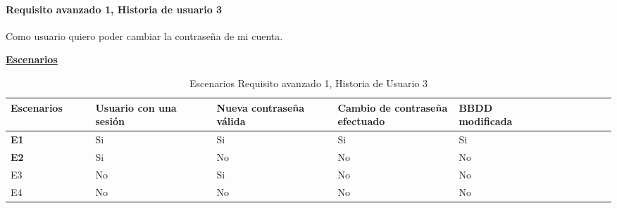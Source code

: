 \documentclass[../ei103948-project-documentation.tex]{subfiles}
\begin{document}
						\newpage


				\paragraph{Requisito avanzado 1, Historia de usuario 3}
				Como usuario quiero poder cambiar la contraseña de mi cuenta.

				\begin{center}
					\textbf{\underline{Escenarios}}
					\begin{table}[H]
						\centering
						\begin{tabular}{|p{0.14\linewidth}|p{0.20\linewidth}|p{0.20\linewidth}|p{0.20\linewidth}|p{0.12\linewidth}|p{0.12\linewidth}|p{0.12\linewidth}|}
							\hline
							\textbf{Escenarios} & \textbf{Usuario con una sesión} & \textbf{Nueva contraseña válida} & \textbf{Cambio de contraseña efectuado} & \textbf{BBDD modificada} \\ \hline
							\textbf{E1}         & Si                                                   & Si                               & Si                                      & Si                       \\ \hline
							\textbf{E2}         & Si                                                   & No                               & No                                      & No                       \\ \hline
							E3                  & No                                                   & Si                               & No                                      & No                       \\ \hline
							E4                  & No                                                   & No                               & No                                      & No                       \\ \hline
							\end{tabular}
						\caption{Escenarios Requisito avanzado 1, Historia de Usuario 3}
					\end{table}

					\descripcionAvanzadaC


\end{center}
\end{document}
